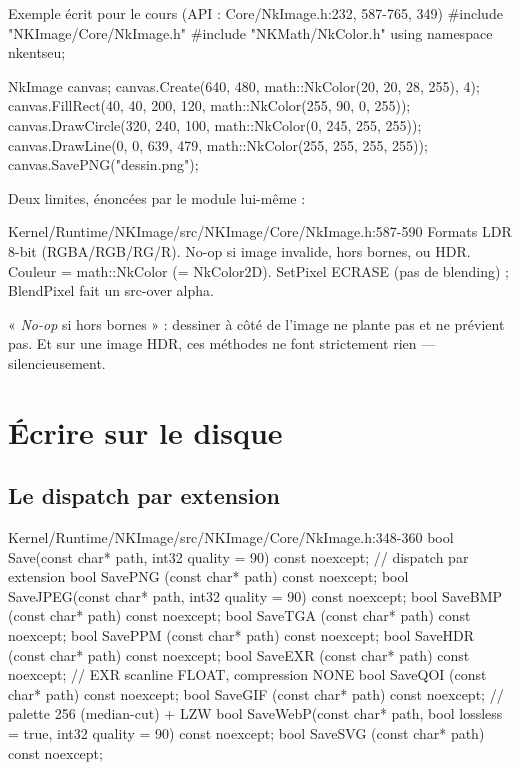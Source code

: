 \begin{nkcode}{Exemple écrit pour le cours (API : Core/NkImage.h:232, 587-765, 349)}
#include "NKImage/Core/NkImage.h"
#include "NKMath/NkColor.h"
using namespace nkentseu;

NkImage canvas;
canvas.Create(640, 480, math::NkColor(20, 20, 28, 255), 4);
canvas.FillRect(40, 40, 200, 120, math::NkColor(255, 90, 0, 255));
canvas.DrawCircle(320, 240, 100, math::NkColor(0, 245, 255, 255));
canvas.DrawLine(0, 0, 639, 479, math::NkColor(255, 255, 255, 255));
canvas.SavePNG("dessin.png");
\end{nkcode}

Deux limites, énoncées par le module lui-même :

\begin{nkcode}{Kernel/Runtime/NKImage/src/NKImage/Core/NkImage.h:587-590}
 Formats LDR 8-bit (RGBA/RGB/RG/R). No-op si image invalide, hors
 bornes, ou HDR. Couleur = math::NkColor (= NkColor2D). SetPixel ECRASE
 (pas de blending) ; BlendPixel fait un src-over alpha.
\end{nkcode}

« \emph{No-op} si hors bornes » : dessiner à côté de l'image ne plante pas et ne
prévient pas. Et sur une image HDR, ces méthodes ne font strictement rien —
silencieusement.

\section{Écrire sur le disque}

\subsection{Le dispatch par extension}

\begin{nkcode}{Kernel/Runtime/NKImage/src/NKImage/Core/NkImage.h:348-360}
bool Save(const char* path, int32 quality = 90) const noexcept;   // dispatch par extension
bool SavePNG (const char* path) const noexcept;
bool SaveJPEG(const char* path, int32 quality = 90) const noexcept;
bool SaveBMP (const char* path) const noexcept;
bool SaveTGA (const char* path) const noexcept;
bool SavePPM (const char* path) const noexcept;
bool SaveHDR (const char* path) const noexcept;
bool SaveEXR (const char* path) const noexcept;   // EXR scanline FLOAT, compression NONE
bool SaveQOI (const char* path) const noexcept;
bool SaveGIF (const char* path) const noexcept;   // palette 256 (median-cut) + LZW
bool SaveWebP(const char* path, bool lossless = true, int32 quality = 90) const noexcept;
bool SaveSVG (const char* path) const noexcept;
\end{nkcode}

